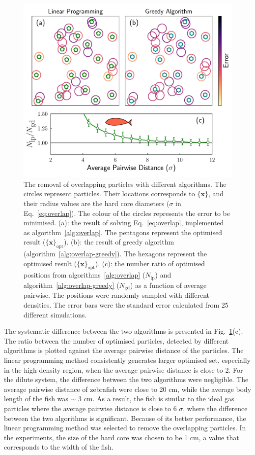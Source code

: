 \documentclass[11pt,twoside]{report}
\begin{document}
\begin{figure}
  \includegraphics[width=\linewidth]{overlap}
  \caption[Removing the overlap particles with different algorithms]{
  The removal of overlapping particles with different algorithms. The circles represent particles. Their locations corresponds to $\{\mathbf{x}\}$, and their radius values are the hard core diameters ($\sigma$ in Eq.~\ref{eq:overlap}). The colour of the circles represents the error to be minimised.
  (a): the result of solving Eq.~\ref{eq:overlap}, implemented as algorithm~\ref{alg:overlap}. The pentagons represent the optimised result ($\{ \mathbf{x} \}_\textrm{opt}$).  
  (b): the result of greedy algorithm (algorithm~\ref{alg:overlap-greedy}). The hexagons represent the optimised result ($\{ \mathbf{x} \}_\textrm{opt}$).
  (c): the number ratio of optimised positions from algorithms~\ref{alg:overlap} ($N_\mathrm{lp}$) and algorithm~\ref{alg:overlap-greedy} ($N_\mathrm{gd}$) as a function of average pairwise. The positions were randomly sampled with different densities. The error bars were the standard error calculated from 25 different simulations.
  }
  \label{fig:overlap}
\end{figure}


The systematic difference between the two algorithms is presented in Fig.~\ref{fig:overlap}(c). The ratio between the number of optimised particles, detected by different algorithms is plotted against the average pairwise distance of the particles. The linear programming method consistently generates larger optimised set, especially in the high density region, when the average pairwise distance is close to 2.
For the dilute system, the difference between the two algorithms were negligible. The average pairwise distance of zebrafish were close to 20 cm\cite{yang2021pcb,miller2007}, while the average body length of the fish was $\sim$ 3 cm. As a result, the fish is similar to the ideal gas particles where the average pairwise distance is close to 6 $\sigma$, where the difference between the two algorithms is significant. Because of its better performance, the linear programming method was selected to remove the overlapping particles. In the experiments, the size of the hard core was chosen to be 1 cm, a value that corresponds to the width of the fish.
\end{document}
